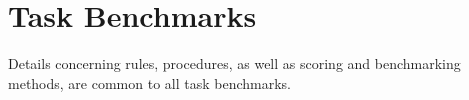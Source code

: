 

%




\clearpage{}


\newpage
\section{Task Benchmarks}
\label{sec:TaskBenchmarks}

Details concerning rules, procedures, as well as scoring and benchmarking methods, are common to all task benchmarks.

